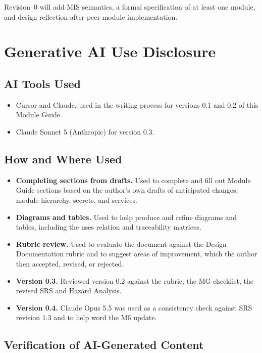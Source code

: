 \documentclass[12pt, titlepage]{article}
\begin{document}
Revision~0 will add MIS semantics, a formal specification of at least one
module, and design reflection after peer module implementation.

\section{Generative AI Use Disclosure}

\subsection{AI Tools Used}

\begin{itemize}
  \item Cursor and Claude, used in the writing process for versions 0.1 and 0.2
  of this Module Guide.
  \item Claude Sonnet 5 (Anthropic) for version 0.3.
\end{itemize}

\subsection{How and Where Used}

\begin{itemize}
  \item \textbf{Completing sections from drafts.} Used to complete and fill
    out Module Guide sections based on the author's own drafts of anticipated
    changes, module hierarchy, secrets, and services.
  \item \textbf{Diagrams and tables.} Used to help produce and refine
    diagrams and tables, including the uses relation and traceability
    matrices.
  \item \textbf{Rubric review.} Used to evaluate the document against the
    Design Documentation rubric and to suggest areas of improvement, which
    the author then accepted, revised, or rejected.
  \item \textbf{Version 0.3.} Reviewed version 0.2 against the
    rubric, the MG checklist, the revised SRS and Hazard Analysis.
  \item \textbf{Version 0.4.} Claude Opus 5.5 was used as a consistency
    check against SRS revision 1.3 and to help word the M6 update.
\end{itemize}

\subsection{Verification of AI-Generated Content}
\end{document}
